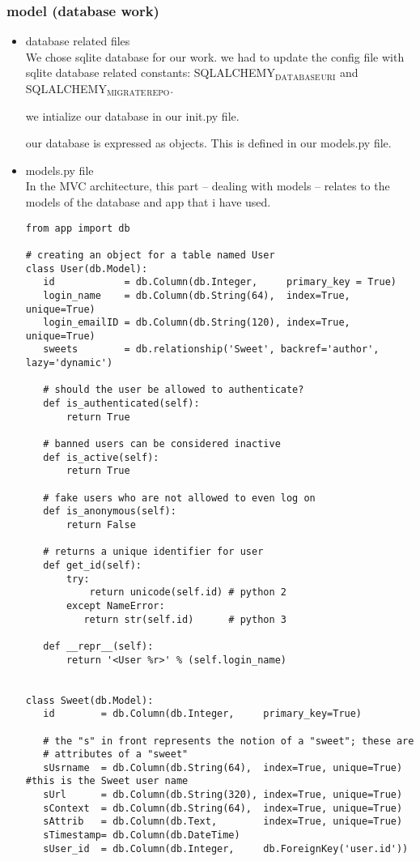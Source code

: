 \documentclass[11pt]{article}
\begin{document}
\subsubsection{model (database work)}
\label{sec-4-2-1}
\begin{itemize}

\item database related files\\
\label{sec-4-2-1-1}%
We chose sqlite database for our work. we had to update the config file with sqlite database related
constants: SQLALCHEMY$_{\mathrm{DATABASE}}$$_{\mathrm{URI}}$ and SQLALCHEMY$_{\mathrm{MIGRATE}}$$_{\mathrm{REPO}}$.

we intialize our database in our init.py file.

our database is expressed as objects. This is defined in our models.py
file.

\item models.py file\\
\label{sec-4-2-1-2}%
In the MVC architecture, this part -- dealing with models -- relates
to the models of the database and app that i have used.

\begin{verbatim}
from app import db

# creating an object for a table named User
class User(db.Model):
   id            = db.Column(db.Integer,     primary_key = True)
   login_name    = db.Column(db.String(64),  index=True, unique=True)
   login_emailID = db.Column(db.String(120), index=True, unique=True)
   sweets        = db.relationship('Sweet', backref='author', lazy='dynamic')

   # should the user be allowed to authenticate?
   def is_authenticated(self):
       return True

   # banned users can be considered inactive    
   def is_active(self):
       return True

   # fake users who are not allowed to even log on
   def is_anonymous(self):
       return False

   # returns a unique identifier for user    
   def get_id(self):
       try:
           return unicode(self.id) # python 2
       except NameError:
          return str(self.id)      # python 3

   def __repr__(self):
       return '<User %r>' % (self.login_name)


class Sweet(db.Model):
   id        = db.Column(db.Integer,     primary_key=True)

   # the "s" in front represents the notion of a "sweet"; these are
   # attributes of a "sweet"
   sUsrname  = db.Column(db.String(64),  index=True, unique=True) #this is the Sweet user name
   sUrl      = db.Column(db.String(320), index=True, unique=True)
   sContext  = db.Column(db.String(64),  index=True, unique=True)
   sAttrib   = db.Column(db.Text,        index=True, unique=True)
   sTimestamp= db.Column(db.DateTime)
   sUser_id  = db.Column(db.Integer,     db.ForeignKey('user.id'))


\end{verbatim}
\end{itemize}
\end{document}
